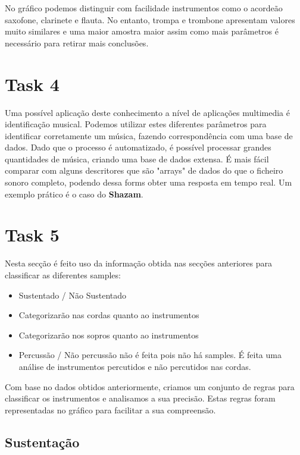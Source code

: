 No gráfico podemos distinguir com facilidade instrumentos como o acordeão saxofone, clarinete e flauta. 
No entanto, trompa e trombone apresentam valores muito similares e uma maior amostra maior assim como mais parâmetros é necessário para retirar mais conclusões.

\section{Task 4} \label{ex_4}

Uma possível aplicação deste conhecimento a nível de aplicações multimedia é identificação musical.
Podemos utilizar estes diferentes parâmetros para identificar corretamente um música, fazendo correspondência com uma base de dados.
Dado que o processo é automatizado, é possível processar grandes quantidades de música, criando uma base de dados extensa.
É mais fácil comparar com alguns descritores que são "arrays" de dados do que o ficheiro sonoro completo, podendo dessa forms obter uma resposta em tempo real.
Um exemplo prático é o caso do \textbf{Shazam}.

\section{Task 5} \label{ex_5}

Nesta secção é feito uso da informação obtida nas secções anteriores para classificar as diferentes samples:
\begin{itemize}
    \item Sustentado / Não Sustentado
    \item Categorizarão nas cordas quanto ao instrumentos
    \item Categorizarão nos sopros quanto ao instrumentos
    \item Percussão / Não percussão não é feita pois não há samples. É feita uma análise de instrumentos percutidos e não percutidos nas cordas.
\end{itemize}

Com base no dados obtidos anteriormente, criamos um conjunto de regras para classificar os instrumentos e analisamos a sua precisão.
Estas regras foram representadas no gráfico para facilitar a sua compreensão.

\subsection{Sustentação}

